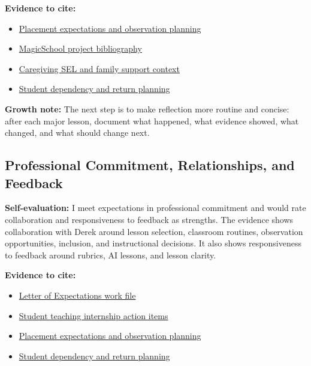 \documentclass[10pt]{article}
\newcommand{\doclink}[2]{\href{run:#1}{#2}}
\begin{document}
\textbf{Evidence to cite:}
\begin{itemize}[leftmargin=*]
  \item \doclink{../../transcripts/non-lesson-context/260210-placement-expectations-and-observation-planning.md}{Placement expectations and observation planning}
  \item \doclink{../../pine-brook-elementary/lessons/grade-3-lamanaco-lallucci-regelsberger-tandoi/magicschool-student-choice-ai-partner-project/magicschool-student-choice-ai-partner-project.bib}{MagicSchool project bibliography}
  \item \doclink{../../transcripts/non-lesson-context/260317-caregiving-sel-and-family-support-context.md}{Caregiving SEL and family support context}
  \item \doclink{../../transcripts/non-lesson-context/260311-student-dependency-and-return-planning.md}{Student dependency and return planning}
\end{itemize}

\textbf{Growth note:} The next step is to make reflection more routine and concise: after each major lesson, document what happened, what evidence showed, what changed, and what should change next.

\subsection{Professional Commitment, Relationships, and Feedback}

\textbf{Self-evaluation:} I meet expectations in professional commitment and would rate collaboration and responsiveness to feedback as strengths. The evidence shows collaboration with Derek around lesson selection, classroom routines, observation opportunities, inclusion, and instructional decisions. It also shows responsiveness to feedback around rubrics, AI lessons, and lesson clarity.

\textbf{Evidence to cite:}
\begin{itemize}[leftmargin=*]
  \item \doclink{../expectations/letter-of-expectations-spring-2026-work.md}{Letter of Expectations work file}
  \item \doclink{./student-teaching-internship-action-items-and-key-information.md}{Student teaching internship action items}
  \item \doclink{../../transcripts/non-lesson-context/260210-placement-expectations-and-observation-planning.md}{Placement expectations and observation planning}
  \item \doclink{../../transcripts/non-lesson-context/260311-student-dependency-and-return-planning.md}{Student dependency and return planning}
\end{itemize}
\end{document}
